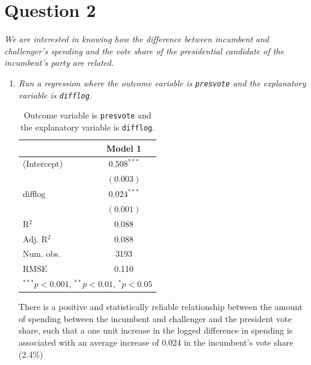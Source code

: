 \documentclass[12pt,letterpaper]{article}
\begin{document}
	\section*{Question 2}
	\noindent \emph{We are interested in knowing how the difference between incumbent and challenger's spending and the vote share of the presidential candidate of the incumbent's party are related.}	\vspace{.25cm}
	\begin{enumerate}
		\item \emph{Run a regression where the outcome variable is \texttt{presvote} and the explanatory variable is \texttt{difflog}.}
		
		
		\begin{table}[h!]
			\begin{center}
				\caption{\footnotesize{Outcome variable is \texttt{presvote} and the explanatory variable is \texttt{difflog}.}} %
				\begin{tabular}{l c }
					\hline
					& Model 1 \\
					\hline
				(Intercept) & $0.508^{***}$ \\
            & $(0.003)$     \\
difflog     & $0.024^{***}$ \\
            & $(0.001)$     \\
\hline
R$^2$       & 0.088         \\
Adj. R$^2$  & 0.088         \\
Num. obs.   & 3193          \\
RMSE        & 0.110         \\
					\hline
					\multicolumn{2}{l}{\scriptsize{$^{***}p<0.001$, $^{**}p<0.01$, $^*p<0.05$}}
				\end{tabular}
				
			\end{center}
		\end{table}
		
		
		\noindent There is a positive and statistically reliable relationship between the amount of spending between the incumbent and challenger and the president vote share, such that a one unit increase in the logged difference in spending is associated with an average increase of 0.024 in the incumbent's vote share (2.4\%)	
		\newpage
		

\end{enumerate}
\end{document}
